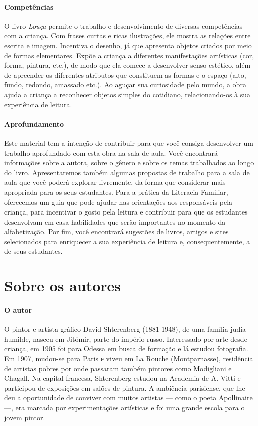 \documentclass[11pt]{extarticle}
\begin{document}
\paragraph{Competências} O livro \textit{Louça} permite o trabalho e desenvolvimento de diversas competências com a criança. Com frases curtas e ricas ilustrações, ele mostra as relações entre escrita e imagem. Incentiva o desenho, já que apresenta objetos criados por meio de formas elementares. Expõe a criança a diferentes manifestações artísticas (cor, forma, pintura, etc.), de modo que ela comece a desenvolver senso estético, além de apreender os diferentes atributos que constituem as formas e o espaço (alto, fundo, redondo, amassado etc.). Ao aguçar sua curiosidade pelo mundo, a obra ajuda a criança a reconhecer objetos simples do cotidiano, relacionando-os à sua experiência de leitura.

\paragraph{Aprofundamento} Este material tem a 
intenção de contribuir para que você consiga desenvolver um trabalho aprofundado 
com esta obra na sala de aula. Você encontrará informações sobre a autora, sobre 
o gênero e sobre os temas trabalhados ao longo do livro. Apresentaremos também 
algumas propostas de trabalho para a sala de aula que você poderá explorar livremente, 
da forma que considerar mais apropriada para os seus estudantes. Para a prática 
da Literacia Familiar, oferecemos um guia que pode ajudar nas orientações aos 
responsáveis pela criança, para incentivar o gosto pela leitura e contribuir para 
que os estudantes desenvolvam em casa habilidades que serão importantes no momento 
da alfabetização. Por fim, você encontrará sugestões de livros, artigos e sites 
selecionados para enriquecer a sua experiência de leitura e, 
consequentemente, a de seus estudantes.



\section{Sobre os autores}

\paragraph{O autor} O pintor e artista gráfico David Shterenberg (1881-1948), de uma família judia humilde, nasceu em Jitómir, parte do império russo. Interessado por arte desde criança, em 1905 foi para Odessa em busca de formação e lá estudou fotografia. Em 1907, mudou-se para Paris е viveu em La Rouche (Montparnasse), residência de artistas pobres por onde passaram também pintores como Modigliani e Chagall. Na capital francesa, Shterenberg estudou na Academia de A. Vitti e participou de exposições em salões de pintura. A ambiência parisiense, que lhe deu a oportunidade de conviver com muitos artistas --- como o poeta Apollinaire ---, era marcada por experimentações artísticas e foi uma grande escola para o jovem pintor. 
\end{document}
